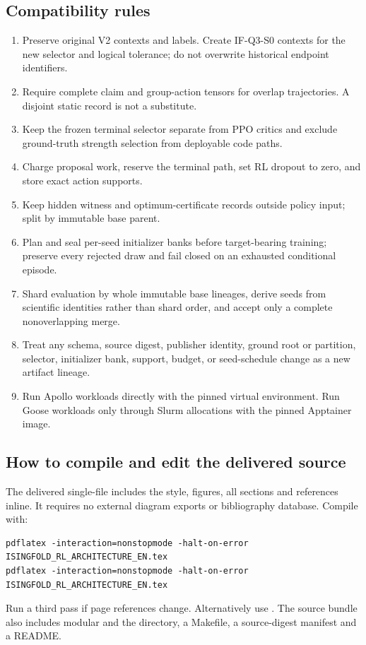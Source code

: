 \subsection{Compatibility rules}
\begin{enumerate}
\item Preserve original V2 contexts and labels. Create IF-Q3-S0 contexts for the new selector and logical tolerance; do not overwrite historical endpoint identifiers.
\item Require complete claim and group-action tensors for overlap trajectories. A disjoint static record is not a substitute.
\item Keep the frozen terminal selector separate from PPO critics and exclude ground-truth strength selection from deployable code paths.
\item Charge proposal work, reserve the terminal path, set RL dropout to zero, and store exact action supports.
\item Keep hidden witness and optimum-certificate records outside policy input; split by immutable base parent.
\item Plan and seal per-seed initializer banks before target-bearing training; preserve every rejected draw and fail closed on an exhausted conditional episode.
\item Shard evaluation by whole immutable base lineages, derive seeds from scientific identities rather than shard order, and accept only a complete nonoverlapping merge.
\item Treat any schema, source digest, publisher identity, ground root or partition, selector, initializer bank, support, budget, or seed-schedule change as a new artifact lineage.
\item Run Apollo workloads directly with the pinned virtual environment. Run Goose workloads only through Slurm allocations with the pinned Apptainer image.
\end{enumerate}

\subsection{How to compile and edit the delivered source}
The delivered single-file  includes the style, figures, all sections and references inline. It requires no external diagram exports or bibliography database. Compile with:
\begin{Verbatim}
pdflatex -interaction=nonstopmode -halt-on-error ISINGFOLD_RL_ARCHITECTURE_EN.tex
pdflatex -interaction=nonstopmode -halt-on-error ISINGFOLD_RL_ARCHITECTURE_EN.tex
\end{Verbatim}
Run a third pass if page references change. Alternatively use . The source bundle also includes modular  and the  directory, a Makefile, a source-digest manifest and a README.

